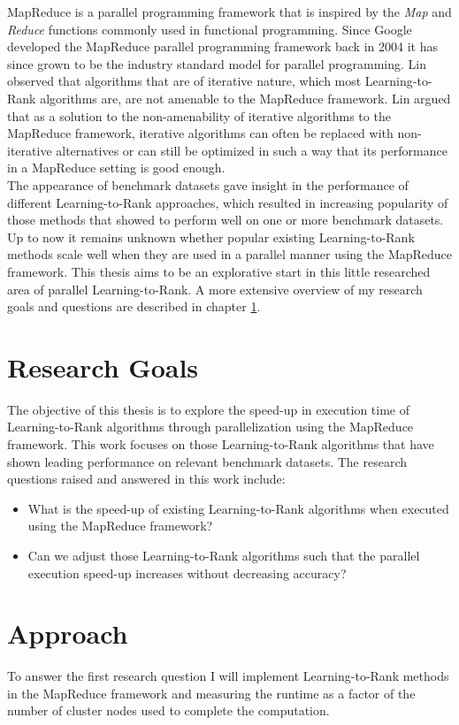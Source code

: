 MapReduce\cite{Dean2004} is a parallel programming framework that is inspired by the \emph{Map} and \emph{Reduce} functions commonly used in functional programming. Since Google developed the MapReduce parallel programming framework back in 2004 it has since grown to be the industry standard model for parallel programming. Lin \cite{Lin2013} observed that algorithms that are of iterative nature, which most Learning-to-Rank algorithms are, are not amenable to the MapReduce framework. Lin argued that as a solution to the non-amenability of iterative algorithms to the MapReduce framework, iterative algorithms can often be replaced with non-iterative alternatives or can still be optimized in such a way that its performance in a MapReduce setting is good enough.\\

The appearance of benchmark datasets gave insight in the performance of different Learning-to-Rank approaches, which resulted in increasing popularity of those methods that showed to perform well on one or more benchmark datasets. Up to now it remains unknown whether popular existing Learning-to-Rank methods scale well when they are used in a parallel manner using the MapReduce framework. This thesis aims to be an explorative start in this little researched area of parallel Learning-to-Rank. A more extensive overview of my research goals and questions are described in chapter \ref{chap:goals}.\\

\chapter{Research Goals}
\label{chap:goals}
The objective of this thesis is to explore the speed-up in execution time of Learning-to-Rank algorithms through parallelization using the MapReduce framework. 
This work focuses on those Learning-to-Rank algorithms that have shown leading performance on relevant benchmark datasets.
The research questions raised and answered in this work include:
\begin{itemize}
\item What is the speed-up of existing Learning-to-Rank algorithms when executed using the MapReduce framework?
\item Can we adjust those Learning-to-Rank algorithms such that the parallel execution speed-up increases without decreasing accuracy?
\end{itemize}

\chapter{Approach}
To answer the first research question I will implement Learning-to-Rank methods in the MapReduce framework and measuring the runtime as a factor of the number of cluster nodes used to complete the computation.\\

